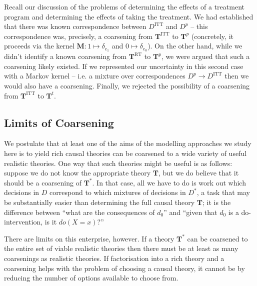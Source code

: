 Recall our discussion of the problems of determining the effects of a treatment program and determining the effects of taking the treatment. We had established that there was known correspondence between $D^{\mathrm{ITT}}$ and $D^p$ -- this correspondence was, precisely, a coarsening from $\mathbf{T}^{\mathrm{ITT}}$ to $\mathbf{T}^p$ (concretely, it proceeds via the kernel $\mathbf{M}:1\mapsto \delta_{e_1}$ and $0\mapsto \delta_{e_0}$). On the other hand, while we didn't identify a known coarsening from $\mathbf{T}^{\mathrm{RT}}$ to $\mathbf{T}^p$, we were argued that such a coarsening likely existed. If we represented our uncertainty in this second case with a Markov kernel -- i.e. a mixture over correspondences $D^p\to D^{\mathrm{ITT}}$ then we would also have a coarsening. Finally, we rejected the possibility of a coarsening from $\mathbf{T}^{\mathrm{ITT}}$ to $\mathbf{T}^t$.

\subsection{Limits of Coarsening}

We postulate that at least one of the aims of the modelling approaches we study here is to yield rich causal theories can be coarsened to a wide variety of useful realistic theories. One way that such theories might be useful is as follows: suppose we do not know the appropriate theory $\mathbf{T}$, but we do believe that it should be a coarsening of $\mathbf{T}^*$. In that case, all we have to do is work out which decisions in $D$ correspond to which mixtures of decisions in $D^*$, a task that may be substantially easier than determining the full causal theory $\mathbf{T}$; it is the difference between ``what are the consequences of $d_0$'' and ``given that $d_0$ is a do-intervention, is it $do(X=x)?$'' 

There are limits on this enterprise, however. If a theory $\mathbf{T}^*$ can be coarsened to the entire set of viable realistic theories then there must be at least as many coarsenings as realistic theories. If factorisation into a rich theory and a coarsening helps with the problem of choosing a causal theory, it cannot be by reducing the number of options available to choose from.


